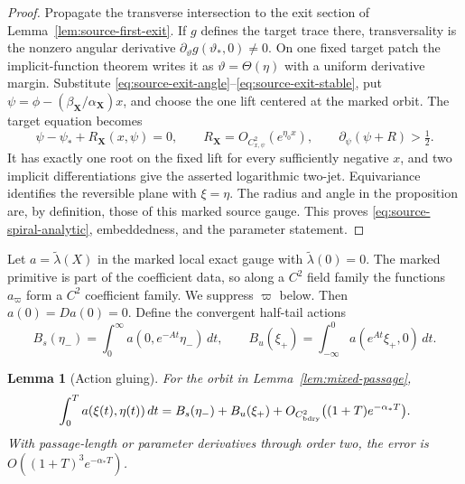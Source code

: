 \documentclass[11pt]{amsart}
\numberwithin{equation}{section}
\newtheorem{lemma}[theorem]{Lemma}
\theoremstyle{definition}
\theoremstyle{remark}
\begin{document}
\begin{proof}
Propagate the transverse intersection to the exit section of
Lemma~\ref{lem:source-first-exit}.  If $g$ defines the target trace there,
transversality is the nonzero angular derivative
$\partial_\vartheta g(\vartheta_*,0)\ne0$.  On one fixed target patch the
implicit-function theorem writes it as
$\vartheta=\Theta(\eta)$ with a uniform derivative margin.  Substitute
\eqref{eq:source-exit-angle}--\eqref{eq:source-exit-stable}, put
$\psi=\phi-(\beta_{\mathbf X}/\alpha_{\mathbf X})x$, and choose the one
lift centered at the marked orbit.  The target equation becomes
\begin{equation}\label{eq:source-target-row}
 \psi-\psi_*+R_{\mathbf X}(x,\psi)=0,
 \qquad
 R_{\mathbf X}=O_{C^2_{x,\psi}}(e^{\eta_0x}),
 \qquad \partial_\psi(\psi+R)>\tfrac12.
\end{equation}
It has exactly one root on the fixed lift for every sufficiently negative
$x$, and two implicit differentiations give the asserted logarithmic
two-jet.  Equivariance identifies the reversible plane with $\xi=\eta$.
The radius and angle in the proposition are, by definition, those of this
marked source gauge.  This proves
\eqref{eq:source-spiral-analytic}, embeddedness, and the parameter
statement.
\end{proof}

Let $a=\widetilde\lambda(X)$ in the marked local exact gauge with
$\widetilde\lambda(0)=0$.  The marked primitive is part of the coefficient
data, so along a $C^2$ field family the functions $a_\varpi$ form a $C^2$
coefficient family.  We suppress $\varpi$ below.  Then $a(0)=Da(0)=0$.
Define the convergent
half-tail actions
\begin{equation}\label{eq:half-actions}
 B_s(\eta_-)=\int_0^\infty a(0,e^{-At}\eta_-)\,dt,
 \qquad
 B_u(\xi_+)=\int_{-\infty}^0a(e^{At}\xi_+,0)\,dt.
\end{equation}

\begin{lemma}[Action gluing]\label{lem:action-gluing}
For the orbit in Lemma~\ref{lem:mixed-passage},
\begin{equation}\label{eq:action-gluing}
 \int_0^T a(\xi(t),\eta(t))\,dt
 =B_s(\eta_-)+B_u(\xi_+)
   +O_{C^2_{\rm bdry}}\bigl((1+T)e^{-\alpha_*T}\bigr).
\end{equation}
With passage-length or parameter derivatives through order two, the error
is $O((1+T)^3e^{-\alpha_*T})$.
\end{lemma}
\end{document}
